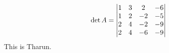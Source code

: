 \documentclass{article}
\begin{document}
$$\det A =
\begin{vmatrix}
1 & 3 & 2 & -6 \\ 
1 & 2 & -2 & -5 \\ 
2 & 4 & -2 & -9 \\ 
2 & 4 & -6 & -9  \notag
\end{vmatrix}
$$
This is Tharun.
\end{document}
